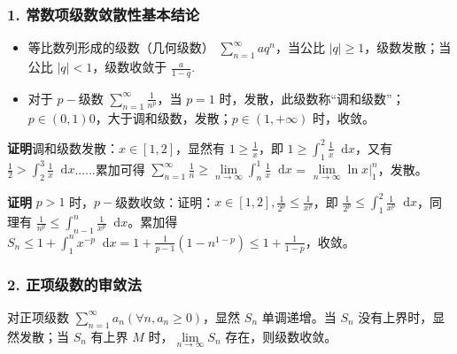 \documentclass[b5paper]{ctexart}
\renewcommand{\d}{\mathop{}\!\mathrm{d}}
\newcommand{\jst}{\sum \limits_{n = 1}^{\infty}}
\begin{document}
	\subsubsection*{1. 常数项级数敛散性基本结论}
	
	\begin{itemize}
		\item 等比数列形成的级数（几何级数） $\jst aq^n$，当公比 $|q| \ge 1$，级数发散；当公比 $|q| < 1$，级数收敛于 $\frac{a}{1 - q}$.
		
		\item 对于 $p-$级数 $\jst \frac{1}{n^p}$，当 $p  = 1$ 时，发散，此级数称“调和级数”；$p \in (0, 1)0$，大于调和级数，发散；$p \in (1, +\infty)$ 时，收敛。

	\end{itemize}
	
	\textbf{证明}调和级数发散：$x \in [1, 2]$，显然有 $1 \ge \frac{1}{x}$，即 $1 \ge \int_{1}^{2} \frac{1}{x} \d x$，又有 $\frac{1}{2} >  \int_{2}^{3} \frac{1}{x} \d x$......累加可得 $\jst \frac{1}{n} \ge \lim\limits_{n \to \infty} \int_{n}^{1} \frac{1}{x} \d x$ = $\lim\limits_{n \to \infty}\ln x |_{1}^{n}$，发散。
	
	\textbf{证明 }$p > 1$ 时，$p-$级数收敛：证明：$x \in [1, 2], \frac{1}{2^p} \le \frac{1}{x^p}$，即 $\frac{1}{2^p} \le \int_{1}^{2} \frac{1}{x^p} \d x$，同理有 $\frac{1}{n^p} \le \int_{n - 1}^{n} \frac{1}{x^p} \d x$。累加得 $S_n \le 1 + \int_{1}^{n} x^{-p} \d x  = 1 + \frac{1}{p - 1} (1 - n^{1 - p}) \le 1 + \frac{1}{1 - p}$，收敛。
	
	\subsubsection*{2. 正项级数的审敛法}
	
	对正项级数 $\jst a_n (\forall n, a_n \ge 0)$，显然 $S_n$ 单调递增。当 $S_n$ 没有上界时，显然发散；当 $S_n$ 有上界 $M$ 时，$\lim\limits_{n \to \infty} S_n$ 存在，则级数收敛。
	
	\vspace{12pt}
	
\end{document}
